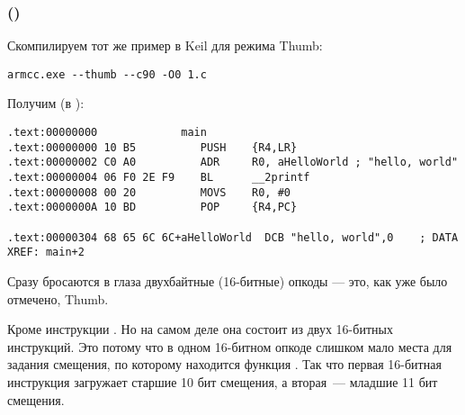 \subsubsection{\NonOptimizingKeilVI (\ThumbMode)}

Скомпилируем тот же пример в Keil для режима Thumb:

\begin{lstlisting}
armcc.exe --thumb --c90 -O0 1.c 
\end{lstlisting}

Получим (в \IDA):

\begin{lstlisting}[caption=\NonOptimizingKeilVI (\ThumbMode) + \IDA,style=customasm]
.text:00000000             main
.text:00000000 10 B5          PUSH    {R4,LR}
.text:00000002 C0 A0          ADR     R0, aHelloWorld ; "hello, world"
.text:00000004 06 F0 2E F9    BL      __2printf
.text:00000008 00 20          MOVS    R0, #0
.text:0000000A 10 BD          POP     {R4,PC}

.text:00000304 68 65 6C 6C+aHelloWorld  DCB "hello, world",0    ; DATA XREF: main+2
\end{lstlisting}

Сразу бросаются в глаза двухбайтные (16-битные) опкоды --- это, как уже было отмечено, Thumb.

Кроме инструкции .
Но на самом деле она состоит из двух 16-битных инструкций.
Это потому что в одном 16-битном опкоде слишком мало места для задания смещения, по которому находится функция \printf.
Так что первая 16-битная инструкция загружает старшие 10 бит смещения, а вторая~--- младшие 11 бит смещения.


